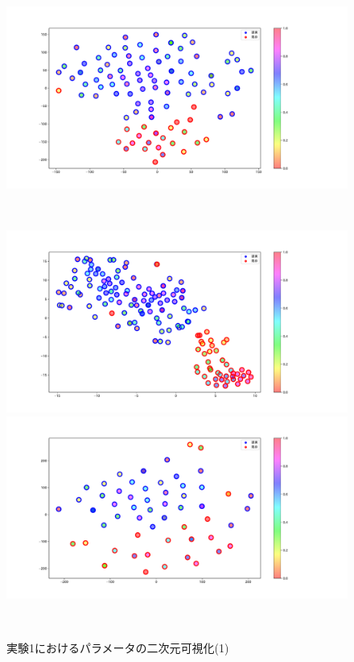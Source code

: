 \begin{figure}[h]
\begin{minipage}[b]{0.48\linewidth}
 \end{minipage}
 \begin{minipage}[b]{0.48\linewidth}
  \centering
  \includegraphics[scale=0.15]{./imgs/tSNE/cake_4.pdf}
 \end{minipage}\\
 \begin{minipage}[b]{0.48\linewidth}
  \centering
  \includegraphics[scale=0.15]{./imgs/tSNE/cake_5.pdf}
 \end{minipage}
 \begin{minipage}[b]{0.48\linewidth}
  \centering
  \includegraphics[scale=0.15]{./imgs/tSNE/cake_6.pdf}
 \end{minipage}\\
 \caption{実験1におけるパラメータの二次元可視化(1)}\label{fig:tSNE1_1}
\end{figure}

